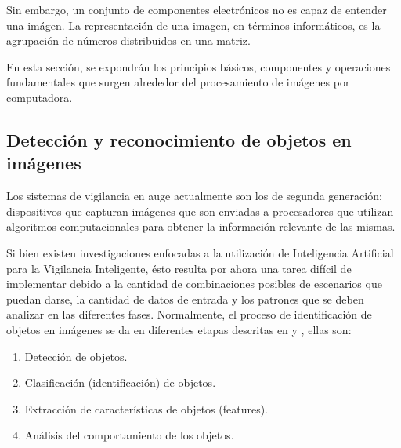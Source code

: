 \documentclass[a4paper,12pt,twoside]{article}
\begin{document}
Sin embargo, un conjunto de componentes electrónicos no es capaz de entender una imágen. La representación de una imagen, en términos informáticos, es la agrupación de números distribuidos en una matriz.\par

En esta sección, se expondrán los principios básicos, componentes y operaciones fundamentales que surgen alrededor del procesamiento de imágenes por computadora.\par


\subsection{Detección y reconocimiento de objetos en imágenes}

Los sistemas de vigilancia en auge actualmente son los de segunda generación: dispositivos que capturan imágenes que son enviadas a procesadores que utilizan algoritmos computacionales para obtener la información relevante de las mismas. \par

Si bien existen investigaciones enfocadas a la utilización de Inteligencia Artificial para la Vigilancia Inteligente, ésto resulta por ahora una tarea difícil de implementar debido a la cantidad de combinaciones posibles de escenarios que puedan darse, la cantidad de datos de entrada y los patrones que se deben analizar en las diferentes fases. Normalmente, el proceso de identificación de objetos en imágenes se da en diferentes etapas descritas en \cite{lozano} y \cite{kamarudin}, ellas son:	
\begin{enumerate}
	\baselineskip 0pt
	\item Detección de objetos.\\	
	\item Clasificación (identificación) de objetos.\\
	\item Extracción de características de objetos (features).\\
	\item Análisis del comportamiento de los objetos.\\
\end{enumerate}	\baselineskip 14pt
\end{document}
